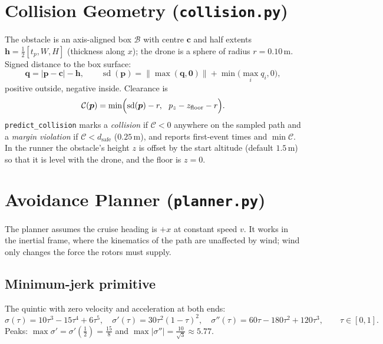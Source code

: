 \documentclass[11pt,a4paper]{article}
\newcommand{\vc}[1]{\bm{#1}}
\newcommand{\norm}[1]{\left\lVert #1\right\rVert}
\newcommand{\abs}[1]{\left\lvert #1\right\rvert}
\newcommand{\code}[1]{\texttt{\small #1}}
\begin{document}
\section{Collision Geometry (\code{collision.py})}
The obstacle is an axis-aligned box $\mathcal B$ with centre $\vc c$ and half extents $\vc h=\tfrac12[t_p,W,H]$ (thickness along $x$); the drone is a sphere of radius $r=0.10$\,m.
Signed distance to the box surface:
\begin{equation}
\vc q=\abs{\vc p-\vc c}-\vc h,\qquad
\operatorname{sd}(\vc p)=\norm{\max(\vc q,\vc 0)}+\min\bigl(\max_i q_i,0\bigr),
\end{equation}
positive outside, negative inside. Clearance is
\begin{equation}
\mathcal C(\vc p)=\min\Bigl(\operatorname{sd}(\vc p)-r,\ \ p_z-z_{\text{floor}}-r\Bigr).
\end{equation}
\code{predict\_collision} marks a \emph{collision} if $\mathcal C<0$ anywhere on the sampled path and a \emph{margin violation} if $\mathcal C<d_{\text{safe}}$ ($0.25$\,m), and reports first-event times and $\min\mathcal C$.
In the runner the obstacle's height $z$ is offset by the start altitude (default $1.5$\,m) so that it is level with the drone, and the floor is $z=0$.

\section{Avoidance Planner (\code{planner.py})}
The planner assumes the cruise heading is $+x$ at constant speed $v$. It works in the inertial frame, where the kinematics of the path are unaffected by wind;
wind only changes the force the rotors must supply.

\subsection{Minimum-jerk primitive}
The quintic with zero velocity and acceleration at both ends:
\begin{equation}
\sigma(\tau)=10\tau^3-15\tau^4+6\tau^5,\quad
\sigma'(\tau)=30\tau^2(1-\tau)^2,\quad
\sigma''(\tau)=60\tau-180\tau^2+120\tau^3,\qquad\tau\in[0,1].
\end{equation}
Peaks: $\max\sigma'=\sigma'(\tfrac12)=\tfrac{15}8$ and $\max\abs{\sigma''}=\tfrac{10}{\sqrt3}\approx5.77$.
\end{document}
